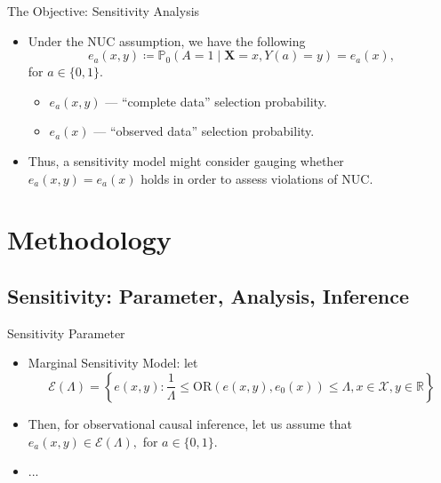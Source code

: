\documentclass{beamer}
\newcommand{\R}{\mathbb{R}}
\newcommand{\pr}{\mathbb{P}}
\begin{document}
\begin{frame}{The Objective: Sensitivity Analysis}

\begin{itemize}
  \itemsep12pt
  \item Under the NUC assumption, we have the following
    \[
      e_a(x,y) \coloneqq \pr_0(A = 1 \mid \bm{X} = x, Y(a) = y) = e_a(x),
    \]
    for $a \in \{0, 1\}$.
    \begin{itemize}
      \itemsep6pt
      \item $e_a(x,y)$ --- ``complete data'' selection probability.
      \item $e_a(x)$ --- ``observed data'' selection probability.
    \end{itemize}
  \item Thus, a sensitivity model might consider gauging whether $e_a(x,y) =
    e_a(x)$ holds in order to assess violations of NUC.
\end{itemize}

\end{frame}

\section{Methodology}
\subsection{Sensitivity: Parameter, Analysis, Inference}

\begin{frame}{Sensitivity Parameter}

\begin{itemize}
  \itemsep12pt
  \item Marginal Sensitivity Model: let
    \[
      \mathcal{E}(\Lambda) = \left\{e(x,y): \frac{1}{\Lambda} \leq
      \text{OR}(e(x,y), e_0(x)) \leq \Lambda, x \in \mathcal{X}, y \in
      \R \right\}
    \]
  \item Then, for observational causal inference, let us assume that
    $e_a(x,y) \in \mathcal{E}(\Lambda),$ for $a \in \{0, 1\}$.
  \item ...
\end{itemize}

\end{frame}

\end{document}
